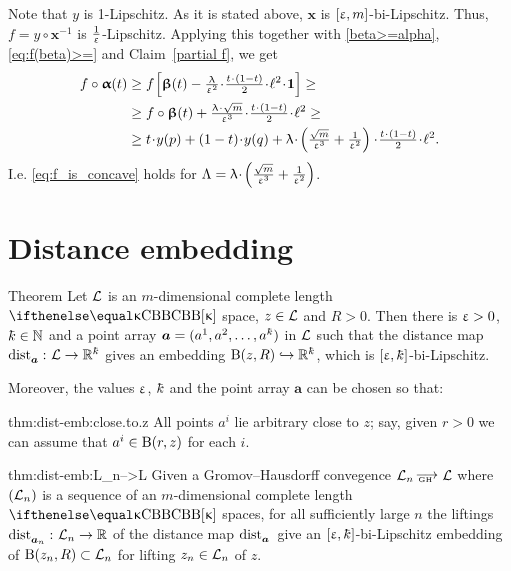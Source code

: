 Note that $y$ is 1-Lipschitz.
As it is stated above, 
$\bm{x}$ is $[\upvarepsilon,m]$-bi-Lipschitz.
Thus, $f=y\circ\bm{x}^{-1}$ is $\tfrac1{\upvarepsilon}$-Lipschitz.
Applying this 
together with \ref{beta>=alpha}, 
\ref{eq:f(beta)>=}
and Claim~\ref{partial f},
we get 
\begin{align*}
f\circ\bm{\alpha}(t)
&\ge 
f
\l[
\bm{\beta}(t)
-
\tfrac\lambda{\eps^2}\cdot\tfrac{t\cdot(1-t)}2\cdot\ell^2\cdot\bm{1}
\r]
\ge
\\
&
\ge
f\circ\bm{\beta}(t)
+
\tfrac{\lambda
\cdot 
\sqrt{m}}{\eps^3}
\cdot
\tfrac{t\cdot(1-t)}2
\cdot
\ell^2
\ge
\\
&
\ge
t\cdot y(p)
+(1-t)\cdot y(q)+
\lambda\cdot\l(\tfrac{\sqrt{m}}{\eps^3}+\tfrac1{\eps^2}\r)
\cdot 
\tfrac{t\cdot(1-t)}2
\cdot
\ell^2.
\end{align*}
I.e. \ref{eq:f_is_concave} holds for $\Lambda=\lambda\cdot\l(\tfrac{\sqrt{m}}{\eps^3}+\tfrac1{\eps^2}\r)$.
\qeds

\section{Distance embedding}\label{sec:dist-embedding}


\begin{thm}{Theorem}\label{thm:dist-emb}
Let $\mathcal{L}$ is an $m$-dimensional complete length $\Alex\kappa$ space, $z\in\spc{L}$ and $R>0$.
Then there is $\upvarepsilon>0$, 
$\kay\in\NN$ 
and a point array $\bm{a}=(a^1,a^2,\dots,a^\kay)$ in $\mathcal{L}$
such that the distance map $\distfun{\bm{a}}{}{}\:\spc{L}\to\RR^\kay$ gives an embedding $\oBall(z,R)\hookrightarrow\RR^\kay$, 
which is $[\eps,\kay]$-bi-Lipschitz.

Moreover, the values $\upvarepsilon$, $\kay$ and the point array $\bm{a}$ can be chosen so that:

\begin{subthm}{thm:dist-emb:close.to.z}
All points $a^i$ lie arbitrary close to $z$;
say, given $r>0$ we can assume that $a^i\in\oBall(r,z)$ for each $i$.
\end{subthm}

\begin{subthm}{thm:dist-emb:L_n-->L}
Given a Gromov--Hausdorff convegence
$\spc{L}_n\GHto\spc{L}$ where $(\mathcal{L}_n)$ is a sequence of an $m$-dimensional complete length $\Alex\kappa$ spaces,
for all sufficiently large $n$
the liftings $\distfun{\bm{a}_n}{}{}\:\spc{L}_n\to\RR$ of the distance map $\mathop{\rm dist}\nolimits_{\bm{a}}^{{}}{}{}$ 
give an $[\eps,\kay]$-bi-Lipschitz embedding of $\oBall(z_n,R)\subset \spc{L}_n$ for lifting $z_n\in\spc{L}_n$ of $z$.
\end{subthm}
\end{thm}

